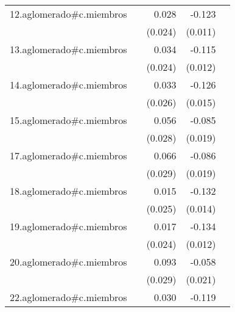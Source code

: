 {\begin{longtable}{l*{4}{D{.}{.}{-1}}}
\addlinespace
12.aglomerado#c.miembros&                     &       0.028         &      -0.123\sym{***}&                     \\
            &                     &     (0.024)         &     (0.011)         &                     \\
\addlinespace
13.aglomerado#c.miembros&                     &       0.034         &      -0.115\sym{***}&                     \\
            &                     &     (0.024)         &     (0.012)         &                     \\
\addlinespace
14.aglomerado#c.miembros&                     &       0.033         &      -0.126\sym{***}&                     \\
            &                     &     (0.026)         &     (0.015)         &                     \\
\addlinespace
15.aglomerado#c.miembros&                     &       0.056\sym{*}  &      -0.085\sym{***}&                     \\
            &                     &     (0.028)         &     (0.019)         &                     \\
\addlinespace
17.aglomerado#c.miembros&                     &       0.066\sym{*}  &      -0.086\sym{***}&                     \\
            &                     &     (0.029)         &     (0.019)         &                     \\
\addlinespace
18.aglomerado#c.miembros&                     &       0.015         &      -0.132\sym{***}&                     \\
            &                     &     (0.025)         &     (0.014)         &                     \\
\addlinespace
19.aglomerado#c.miembros&                     &       0.017         &      -0.134\sym{***}&                     \\
            &                     &     (0.024)         &     (0.012)         &                     \\
\addlinespace
20.aglomerado#c.miembros&                     &       0.093\sym{**} &      -0.058\sym{**} &                     \\
            &                     &     (0.029)         &     (0.021)         &                     \\
\addlinespace
22.aglomerado#c.miembros&                     &       0.030         &      -0.119\sym{***}&                     \\

\end{longtable}}
